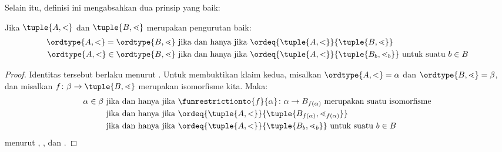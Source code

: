 \documentclass[../../../include/open-logic-section]{subfiles}
\begin{document}
Selain itu, definisi ini mengabsahkan dua prinsip yang baik:

\begin{cor}
Jika $\tuple{A, <}$ dan $\tuple{B, \lessdot}$ merupakan pengurutan baik:
\begin{align*}
	\ordtype{A, <} = \ordtype{B, \lessdot}&\text{ jika dan hanya jika }\ordeq{\tuple{A, <}}{\tuple{B, \lessdot}}\\
	\ordtype{A, <} \in \ordtype{B, \lessdot}&\text{ jika dan hanya jika }\ordeq{\tuple{A, <}}{\tuple{B_b, \lessdot_b}}\text{ untuk suatu }b \in B
\end{align*}
\end{cor}

\begin{proof}
Identitas tersebut berlaku menurut . Untuk
membuktikan klaim kedua, misalkan $\ordtype{A, <} = \alpha$ dan
$\ordtype{B, \lessdot} = \beta$, dan misalkan $f \colon \beta \to \tuple
{B, \lessdot}$ merupakan isomorfisme kita. Maka:
\begin{align*}
	\alpha \in \beta&\text{ jika dan hanya jika }\funrestrictionto{f}{\alpha} \colon \alpha \to B_{f(\alpha)}\text{ merupakan suatu isomorfisme}\\
	&\text{ jika dan hanya jika }\ordeq{\tuple{A, <}}{\tuple{B_{f(\alpha)}, \lessdot_{f(\alpha)}}}\\
	&\text{ jika dan hanya jika }\ordeq{\tuple{A, <}}{\tuple{B_b, \lessdot_b}}\text{ untuk suatu $b \in B$}
\end{align*}
menurut ,
, dan
.
\end{proof}
\end{document}

